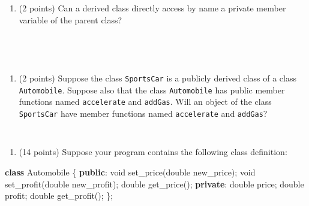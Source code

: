 \documentclass[
]{article}
\newenvironment{Shaded}{}{}
\newcommand{\DataTypeTok}[1]{\textcolor[rgb]{0.56,0.13,0.00}{#1}}
\newcommand{\KeywordTok}[1]{\textcolor[rgb]{0.00,0.44,0.13}{\textbf{#1}}}
\newcommand{\NormalTok}[1]{#1}
\providecommand{\tightlist}{%
  \setlength{\itemsep}{0pt}\setlength{\parskip}{0pt}}
\begin{document}
\begin{verbatim}




\end{verbatim}

\begin{enumerate}
\def\labelenumi{\arabic{enumi}.}
\setcounter{enumi}{2}
\tightlist
\item
  (2 points) Can a derived class directly access by name a private
  member variable of the parent class?
\end{enumerate}

\begin{verbatim}




\end{verbatim}

\begin{enumerate}
\def\labelenumi{\arabic{enumi}.}
\setcounter{enumi}{3}
\tightlist
\item
  (2 points) Suppose the class \texttt{SportsCar} is a publicly derived
  class of a class \texttt{Automobile}. Suppose also that the class
  \texttt{Automobile} has public member functions named
  \texttt{accelerate} and \texttt{addGas}. Will an object of the class
  \texttt{SportsCar} have member functions named \texttt{accelerate} and
  \texttt{addGas}?
\end{enumerate}

\begin{verbatim}


\end{verbatim}

\begin{enumerate}
\def\labelenumi{\arabic{enumi}.}
\setcounter{enumi}{4}
\tightlist
\item
  (14 points) Suppose your program contains the following class
  definition:
\end{enumerate}

\begin{Shaded}
\begin{Highlighting}[]
\KeywordTok{class}\NormalTok{ Automobile \{}
   \KeywordTok{public}\NormalTok{:}
      \DataTypeTok{void}\NormalTok{ set\_price(}\DataTypeTok{double}\NormalTok{ new\_price);}
      \DataTypeTok{void}\NormalTok{ set\_profit(}\DataTypeTok{double}\NormalTok{ new\_profit);}
      \DataTypeTok{double}\NormalTok{ get\_price();}
   \KeywordTok{private}\NormalTok{:}
      \DataTypeTok{double}\NormalTok{ price;}
      \DataTypeTok{double}\NormalTok{ profit;}
      \DataTypeTok{double}\NormalTok{ get\_profit();}
\NormalTok{\};}
\end{Highlighting}
\end{Shaded}
\end{document}
